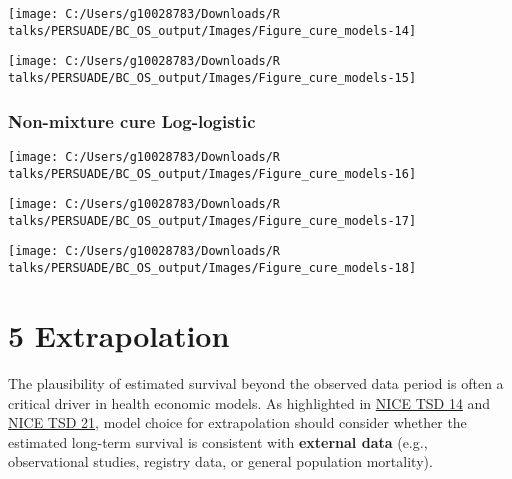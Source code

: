 \documentclass[
]{article}
\begin{document}
\begin{flushleft}\texttt{[image: C:/Users/g10028783/Downloads/R talks/PERSUADE/BC\_OS\_output/Images/Figure\_cure\_models-14]} \end{flushleft}

\begin{flushleft}\texttt{[image: C:/Users/g10028783/Downloads/R talks/PERSUADE/BC\_OS\_output/Images/Figure\_cure\_models-15]} \end{flushleft}

\clearpage

\subsubsection{Non-mixture cure
Log-logistic}\label{non-mixture-cure-log-logistic}

\begin{flushleft}\texttt{[image: C:/Users/g10028783/Downloads/R talks/PERSUADE/BC\_OS\_output/Images/Figure\_cure\_models-16]} \end{flushleft}

\begin{flushleft}\texttt{[image: C:/Users/g10028783/Downloads/R talks/PERSUADE/BC\_OS\_output/Images/Figure\_cure\_models-17]} \end{flushleft}

\begin{flushleft}\texttt{[image: C:/Users/g10028783/Downloads/R talks/PERSUADE/BC\_OS\_output/Images/Figure\_cure\_models-18]} \end{flushleft}

\clearpage

\section{5 Extrapolation}\label{extrapolation}

The plausibility of estimated survival beyond the observed data period
is often a critical driver in health economic models. As highlighted in
\href{https://nicedsu.org.uk/wp-content/uploads/2016/03/NICE-DSU-TSD-Survival-analysis.updated-March-2013.v2.pdf}{NICE
TSD 14} and \href{https://www.sheffield.ac.uk/media/34188/download}{NICE
TSD 21}, model choice for extrapolation should consider whether the
estimated long-term survival is consistent with \textbf{external data}
(e.g., observational studies, registry data, or general population
mortality).
\end{document}
